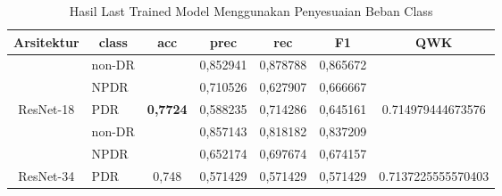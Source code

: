 \begin{table}[hbtp]
	\begin{center}
		\caption{Hasil Last Trained Model Menggunakan Penyesuaian Beban Class}
		\label{tb:HasilLastClassWeight}
		\begin{tabular}{|c|l|c|l|l|l|c|}
			\hline
			\rowcolor[HTML]{C0C0C0} 
			Arsitektur & \multicolumn{1}{c|}{\cellcolor[HTML]{C0C0C0}class} & acc                      & \multicolumn{1}{c|}{\cellcolor[HTML]{C0C0C0}prec} & \multicolumn{1}{c|}{\cellcolor[HTML]{C0C0C0}rec} & \multicolumn{1}{c|}{\cellcolor[HTML]{C0C0C0}F1} & QWK                                  \\ \hline
			& non-DR                                             &                          & 0,852941                                          & 0,878788                                         & 0,865672                                        &                                      \\ \cline{2-2} \cline{4-6}
			& NPDR                                               &                          & 0,710526                                          & 0,627907                                         & 0,666667                                        &                                      \\ \cline{2-2} \cline{4-6}
			\multirow{-3}{*}{ResNet-18}  & PDR                                                & \multirow{-3}{*}{\textbf{0,7724}} & 0,588235                                 & 0,714286                                         & 0,645161                                        & \multirow{-3}{*}{0.714979444673576}  \\ \hline
			& non-DR                                             &                          & 0,857143                                          & 0,818182                                         & 0,837209                                        &                                      \\ \cline{2-2} \cline{4-6}
			& NPDR                                               &                          & 0,652174                                          & 0,697674                                         & 0,674157                                        &                                      \\ \cline{2-2} \cline{4-6}
			\multirow{-3}{*}{ResNet-34}  & PDR                                                & \multirow{-3}{*}{0,748}  & 0,571429                                          & 0,571429                                         & 0,571429                                        & \multirow{-3}{*}{0.7137225555570403} \\ \hline

\end{tabular}
\end{center}
\end{table}
